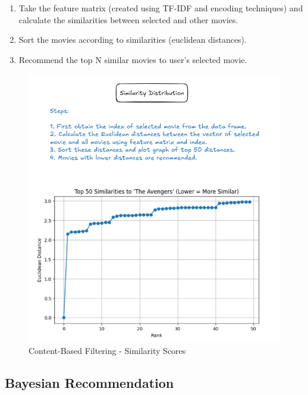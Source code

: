 \documentclass[a4paper]{article}
\theoremstyle{plain}
\begin{document}
\begin{enumerate}
    \item Take the feature matrix (created using TF-IDF and encoding techniques) and calculate the similarities between selected and other movies.
    \item Sort the movies according to similarities (euclidean distances).
    \item Recommend the top N similar movies to user's selected movie.
\end{enumerate}
\begin{figure}[H]
    \centering
    \includegraphics[width=\linewidth]{cbf_vis1.png}
    \caption{Content-Based Filtering - Similarity Scores}
    \label{fig:cbf}
\end{figure}
\subsection{Bayesian Recommendation}
\end{document}

